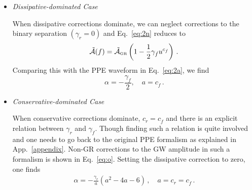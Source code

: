 \documentclass[prd,twocolumn,nofootinbib]{revtex4-1}
\newcommand{\GR}{{\mbox{\tiny GR}}}
\newcommand{\ky}[1]{\textcolor{blue}{\it{\textbf{ky: #1}}} }
\newcommand{\st}[1]{\textcolor{cyan}{\it{\textbf{st: #1}}} }
\begin{document}
\begin{itemize}

\item
\emph{Dissipative-dominated Case}

When dissipative corrections dominate, we can neglect corrections to the binary separation $(\gamma_{r} = 0)$ and Eq.~\eqref{eq:2n} reduces to
\begin{equation}
\tilde{\mathcal{A}}(f)=\tilde{\mathcal{A}}_{\GR} \left(1-\frac{1}{2}\gamma_{\dot{f}}u^{c_{\dot{f}}}\right)\,.
\end{equation}
Comparing this with the PPE waveform in Eq.~\eqref{eq:2a}, we find
\begin{equation}\label{eq:2t}
\alpha=-\frac{\gamma_{\dot{f}}}{2},\quad a=c_{\dot{f}}\,.
\end{equation}

\item
\emph{Conservative-dominated Case}

When conservative corrections dominate, $c_r = c_{\dot f}$ and there is an explicit relation between $\gamma_{r}$ and $\gamma_{\dot f}$. Though finding such a relation is quite involved and one needs to go back to the original PPE formalism as explained in App.~\ref{appendix}. Non-GR corrections to the GW amplitude in such a formalism is shown in Eq.~\eqref{eq:o}. Setting the dissipative correction to zero, one finds 
\begin{align}\label{eq:2u}
\alpha=-\frac{\gamma_r}{a}(a^2-4a-6)\,, \quad a=c_r = c_{\dot f}\,.
\end{align} 


\end{itemize}
\end{document}
